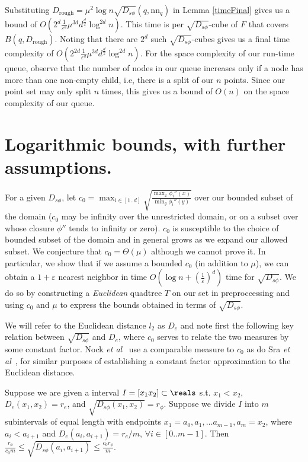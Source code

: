 \documentclass[11pt]{myclass}
\newcommand{\sbreg}{\ensuremath{D_{s\phi}}}
\newcommand{\eps}{\varepsilon}
\newcommand{\etal}{\emph{et al}\xspace}
\begin{document}
Substituting $D_{\text{rough}} = \mu^2 \log n \sqrt{\sbreg}(q, \text{nn}_q) $ in Lemma \ref{timeFinal} gives us a bound 
of $O\left(2^d \frac{1}{\eps^d}  \mu^{3d} d^{\frac{d}{2}} \log^{2d} n\right)$. 
 This time is per $\sqrt{\sbreg}$-cube of $F$ that covers $B(q,D_{\text{rough}})$. Noting 
that there are $2^d$ such $\sqrt{\sbreg}$-cubes gives us a final time complexity of $O\left(2^{2d}   \frac{1}{\eps^d} \mu^{3d} d^{\frac{d}{2}} \log^{2d} n \right)$.
For the space complexity of our run-time queue, observe that the number of nodes in our queue 
increases only if a node has more than one non-empty child, i.e, there is a split of our $n$ points. 
Since our point set may only split $n$ times, this gives us a bound of $O(n)$ on the space complexity 
of our queue. 


\section{Logarithmic bounds, with further assumptions.}
\label{sec:condition}
For a given $\sbreg$, let $c_0 = \max_{ i\in [1..d]} \sqrt{\frac{ \max_x \phi_i'' (x)} {  \min_y \phi_i''(y)}}$ 
over our bounded subset of the domain ($c_0$ may be infinity over the unrestricted domain, or on a subset over whose closure $\phi''$ tends to infinity or zero). $c_0$ is susceptible to the choice of bounded subset of the domain and in general grows as we expand our allowed subset.
We conjecture that $c_0 = \Theta(\mu)$ although we cannot prove it. In particular, we show that if we assume a bounded $c_0$ (in addition to $\mu$), 
we can obtain a $1 + \eps$ nearest neighbor in time $O(\log n + (\frac{1}{\eps})^d)$ time for $\sqrt{\sbreg}$. We do so by constructing a \emph{Euclidean} quadtree $T$ on our set
in preproccessing and using $c_0$ and $\mu$ to express the bounds obtained in terms of $\sqrt{\sbreg}$.

We will refer to the Euclidean distance $l_2$ as $D_e$ and note first the following key relation between $\sqrt{\sbreg}$ and $D_e$, where $c_0$ serves to relate the two measures by some constant factor. Nock \etal~\cite{mixed} use a comparable measure to $c_0$ as do Sra \etal~\cite{tensorclust}, for similar purposes of establishing a constant factor approximation 
to the Euclidean distance.

\begin{lemma}\label{EucBregBisect}
Suppose we are given a interval $I = [x_1 x_2] \subset \reals$ s.t. $x_1 < x_2$, $D_e(x_1, x_2) = r_e$, and $\sqrt{\sbreg(x_1,x_2)} = r_{\phi}$. 
Suppose we divide $I$ into $m$ subintervals of equal length with endpoints $x_1 = a_0, a_1,\ldots a_{m-1}, a_m = x_2$, where $a_i < a_{i+1}$ and $D_e (a_i, a_{i+1}) = r_e /m$, $\forall i\in[0..m-1]$.
Then $\frac{r_{\phi} }{c_0 m } \leq \sqrt{\sbreg (a_i, a_{i+1})} \leq  \frac{c_0 r_{\phi}}{m}$.
\end{lemma}
\end{document}
